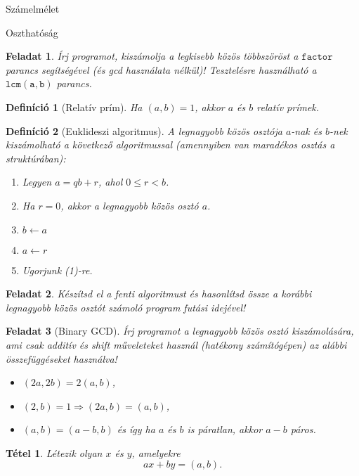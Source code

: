 \documentclass{amsbook}
\theoremstyle{mystyle}
\newtheorem{exercise}{Feladat}[part]
\newtheorem{definition}{Definíció}[section]
\newtheorem{theorem}{Tétel}[section]
\begin{document}
\begin{part}{Számelmélet}
\begin{section}{Oszthatóság}
  \begin{exercise}
    Írj programot, kiszámolja a legkisebb közös többszöröst a $\mathtt{factor}$
    parancs segítségével (és gcd használata nélkül)! Tesztelésre használható a
    $\mathtt{lcm(a,b)}$ parancs.
  \end{exercise}

  \begin{definition}[Relatív prím]
    Ha $(a,b)=1$, akkor $a$ és $b$ relatív prímek.
  \end{definition}

  \begin{definition}[Euklideszi algoritmus] A legnagyobb közös
    osztója $a$-nak és $b$-nek kiszámolható a következ\H o algoritmussal
    (amennyiben van maradékos osztás a struktúrában):
    \begin{enumerate}
      \item Legyen $a = qb + r$, ahol $0 \le r < b$. 
      \item Ha $r = 0$, akkor a legnagyobb közös osztó $a$.
      \item $b \leftarrow a$
      \item $a \leftarrow  r$
      \item Ugorjunk (1)-re.
    \end{enumerate}
  \end{definition}

  \begin{exercise}
    Készítsd el a fenti algoritmust és hasonlítsd össze a korábbi legnagyobb
    közös osztót számoló program futási idejével!
  \end{exercise}
  
  \begin{exercise}[Binary GCD] Írj programot a legnagyobb közös osztó kiszámolására, ami
    csak additív és shift műveleteket használ (hatékony
    számítógépen) az alábbi összefüggéseket használva!
    \begin{itemize}
      \item $(2a,2b) = 2(a,b)$,
      \item $(2,b)=1 \Rightarrow (2a,b) = (a,b)$,
      \item $(a,b) = (a-b,b)$ és így ha $a$ és $b$ is páratlan, akkor $a-b$
        páros.
    \end{itemize}
  \end{exercise}

  \begin{theorem} 
    Létezik olyan $x$ és $y$, amelyekre \[ ax+by=(a,b). \]
  \end{theorem}
  

\end{section}
\end{part}
\end{document}
